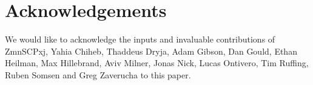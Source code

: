 \documentclass[a4paper]{article}
\begin{document}
\section{Acknowledgements}

We would like to acknowledge the inputs and invaluable contributions of ZmnSCPxj, Yahia Chiheb, Thaddeus Dryja, Adam Gibson, Dan Gould, Ethan Heilman, Max Hillebrand, Aviv Milner, Jonas Nick, Lucas Ontivero, Tim Ruffing, Ruben Somsen and Greg Zaverucha to this paper.

\printbibliography
\end{document}

